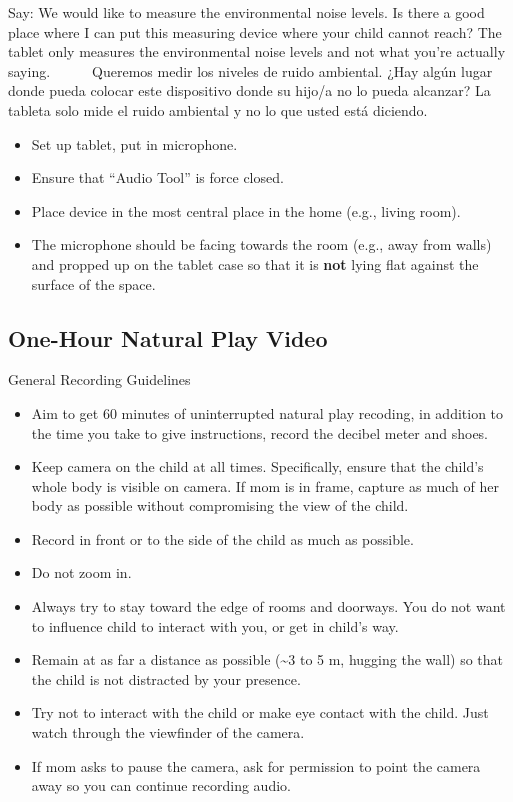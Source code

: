 \documentclass[
  12pt,
]{book}
\providecommand{\tightlist}{%
  \setlength{\itemsep}{0pt}\setlength{\parskip}{0pt}}
\begin{document}
Say: We would like to measure the environmental noise levels. Is there a good place where I can put this measuring device where your child cannot reach? The tablet only measures the environmental noise levels and not what you're actually saying.
    Queremos medir los niveles de ruido ambiental. ¿Hay algún lugar donde pueda colocar este dispositivo donde su hijo/a no lo pueda alcanzar? La tableta solo mide el ruido ambiental y no lo que usted está diciendo.

\begin{itemize}
\tightlist
\item
  Set up tablet, put in microphone.
\item
  Ensure that ``Audio Tool'' is force closed.
\item
  Place device in the most central place in the home (e.g., living room).
\item
  The microphone should be facing towards the room (e.g., away from walls) and propped up on the tablet case so that it is \textbf{not} lying flat against the surface of the space.
\end{itemize}

\hypertarget{one-hour-natural-play-video}{%
\subsection{One-Hour Natural Play Video}\label{one-hour-natural-play-video}}

General Recording Guidelines

\begin{itemize}
\tightlist
\item
  Aim to get 60 minutes of uninterrupted natural play recoding, in addition to the time you take to give instructions, record the decibel meter and shoes.
\item
  Keep camera on the child at all times. Specifically, ensure that the child's whole body is visible on camera. If mom is in frame, capture as much of her body as possible without compromising the view of the child.
\item
  Record in front or to the side of the child as much as possible.
\item
  Do not zoom in.
\item
  Always try to stay toward the edge of rooms and doorways. You do not want to influence child to interact with you, or get in child's way.
\item
  Remain at as far a distance as possible (\textasciitilde3 to 5 m, hugging the wall) so that the child is not distracted by your presence.
\item
  Try not to interact with the child or make eye contact with the child. Just watch through the viewfinder of the camera.
\item
  If mom asks to pause the camera, ask for permission to point the camera away so you can continue recording audio.
\end{itemize}
\end{document}
